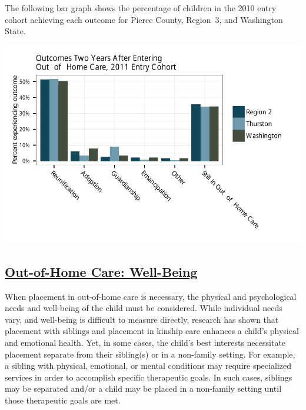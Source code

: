 \documentclass{article}\usepackage{graphicx, color}
\makeatletter
\def\maxwidth{ %
  \ifdim\Gin@nat@width>\linewidth
    \linewidth
  \else
    \Gin@nat@width
  \fi
}
\newenvironment{knitrout}{}{} %
\makeatother
\begin{document}
The following bar graph shows the percentage of children in the 2010 entry cohort achieving each outcome for Pierce County, Region~3, and Washington State.
\nopagebreak[3]
\begin{knitrout}
\color{fgcolor}

{\centering \includegraphics[width=\maxwidth]{figure/ooh_outcomes} 

}



\end{knitrout}


\subsection{\href{http://www.partnersforourchildren.org/child-well-being/visualizations/out-home-care/well-being}
    {Out-of-Home Care: Well-Being}
}

When placement in out-of-home care is necessary, the physical and psychological needs and well-being of the child must be considered. While individual needs vary, and well-being is difficult to measure directly, research has shown that placement with siblings and placement in kinship care enhances a child's physical and emotional health. Yet, in some cases, the child's best interests necessitate placement separate from their sibling(s) or in a non-family setting. For example, a sibling with physical, emotional, or mental conditions may require specialized services in order to accomplish specific therapeutic goals. In such cases, siblings may be separated and/or a child may be placed in a non-family setting until those therapeutic goals are met.
\end{document}
